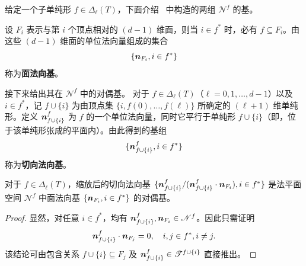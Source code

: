 给定一个子单纯形 $f\in \Delta_{\ell}(T)$，下面介绍~\cite{ChenChenHuangWei2024} 中构造的两组 $\mathscr N^f$ 的基。

设 $F_i$ 表示与第 $i$ 个顶点相对的 $(d-1)$ 维面，则当 $i\in f^*$ 时，必有 $f\subseteq F_i$。由这些 $(d-1)$ 维面的单位法向量组成的集合
\begin{equation*}
\{\boldsymbol n_{F_i}, i\in f^*\}
\end{equation*}
称为\textbf{面法向基}。

接下来给出其在 $\mathscr N^f$ 中的对偶基。
对于 $f \in \Delta_{\ell}(T)$（$\ell = 0, 1, \dots, d-1$）以及 $i \in f^*$，记 $f\cup\{i\}$ 为由顶点集 $\{i,f(0),\dots,f(\ell)\}$ 所确定的 $(\ell+1)$ 维单纯形。定义 $\boldsymbol n_{f\cup\{i\}}^f$ 为 $f$ 的一个单位法向量，同时它平行于单纯形 $f\cup\{i\}$（即，位于该单纯形张成的平面内）。由此得到的基组
\begin{equation*}%
\{\bs n_{f\cup\{i\}}^f, i\in f^*\}
\end{equation*}
称为\textbf{切向法向基}。



\begin{lemma}\label{lem:normaldual}
对于 $f\in \Delta_{\ell}(T)$，缩放后的切向法向基 $\{\boldsymbol n_{f\cup\{i\}}^f/(\boldsymbol n_{f\cup\{i\}}^f\cdot\boldsymbol n_{F_i}), i\in f^*\}$ 是法平面空间 $\mathscr N^f$ 中面法向基 $\{\boldsymbol n_{F_i}, i\in f^*\}$ 的对偶基。
\end{lemma}
\begin{proof}
显然，对任意 $i\in f^*$，均有 $\boldsymbol n_{f\cup\{i\}}^f, \boldsymbol n_{F_i}\in \mathscr N^f$。因此只需证明
\begin{equation*}
 \boldsymbol n_{f\cup\{i\}}^f\cdot\boldsymbol n_{F_j}=0, \quad  i,j\in f^*, i\neq j.
\end{equation*}
该结论可由包含关系 $f\cup\{i\}\subseteq F_j$ 及 $\boldsymbol n_{f\cup\{i\}}^f\in \mathscr T^{f\cup\{i\}}$ 直接推出。
\end{proof}


